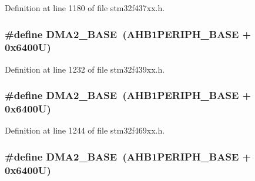 Definition at line 1180 of file stm32f437xx.\+h.

\subsubsection[{\texorpdfstring{D\+M\+A2\+\_\+\+B\+A\+SE}{DMA2_BASE}}]{\setlength{\rightskip}{0pt plus 5cm}\#define D\+M\+A2\+\_\+\+B\+A\+SE~({\bf A\+H\+B1\+P\+E\+R\+I\+P\+H\+\_\+\+B\+A\+SE} + 0x6400\+U)}\hypertarget{group___peripheral__memory__map_gab72a9ae145053ee13d1d491fb5c1df64}{}\label{group___peripheral__memory__map_gab72a9ae145053ee13d1d491fb5c1df64}


Definition at line 1232 of file stm32f439xx.\+h.

\subsubsection[{\texorpdfstring{D\+M\+A2\+\_\+\+B\+A\+SE}{DMA2_BASE}}]{\setlength{\rightskip}{0pt plus 5cm}\#define D\+M\+A2\+\_\+\+B\+A\+SE~({\bf A\+H\+B1\+P\+E\+R\+I\+P\+H\+\_\+\+B\+A\+SE} + 0x6400\+U)}\hypertarget{group___peripheral__memory__map_gab72a9ae145053ee13d1d491fb5c1df64}{}\label{group___peripheral__memory__map_gab72a9ae145053ee13d1d491fb5c1df64}


Definition at line 1244 of file stm32f469xx.\+h.

\subsubsection[{\texorpdfstring{D\+M\+A2\+\_\+\+B\+A\+SE}{DMA2_BASE}}]{\setlength{\rightskip}{0pt plus 5cm}\#define D\+M\+A2\+\_\+\+B\+A\+SE~({\bf A\+H\+B1\+P\+E\+R\+I\+P\+H\+\_\+\+B\+A\+SE} + 0x6400\+U)}\hypertarget{group___peripheral__memory__map_gab72a9ae145053ee13d1d491fb5c1df64}{}\label{group___peripheral__memory__map_gab72a9ae145053ee13d1d491fb5c1df64}


